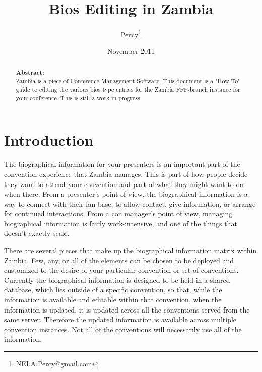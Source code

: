 \documentclass[captions=tablesignature]{scrartcl}
\author{Percy\thanks{NELA.Percy@gmail.com}}
\date{November 2011}
\title{Bios Editing in Zambia}
\begin{document}
\maketitle
{}
\thispagestyle{fancy}
\renewcommand{\headrulewidth}{0pt}
\renewcommand{\footrulewidth}{0pt}
\lhead{}
\rhead{}
\chead{}
\lfoot{}
\cfoot{}
\rfoot{}
\begin{abstract}
\vspace{5cm}
{\LARGE{\textbf{Abstract:\\}}}
Zambia is a piece of Conference Management Software.  This document is a "How To" guide to editing the various bios type entries for the Zambia FFF-branch instance for your conference.  This is still a work in progress.
\end{abstract}
\newpage
\renewcommand{\headrulewidth}{1pt}
\renewcommand{\footrulewidth}{1pt}
\rfoot{\thepage}
\setcounter{tocdepth}{3}
\tableofcontents
\listoftables
\newpage
{}
\section{Introduction}
\label{sec-1}

The biographical information for your presenters is an important
part of the convention experience that Zambia manages.  This is part
of how people decide they want to attend your convention and part of
what they might want to do when there.  From a presenter's point of
view, the biographical information is a way to connect with their
fan-base, to allow contact, give information, or arrange for
continued interactions.  From a con manager's point of view,
managing biographical information is fairly work-intensive, and one
of the things that doesn't exactly scale.

There are several pieces that make up the biographical information
matrix within Zambia.  Few, any, or all of the elements can be
chosen to be deployed and customized to the desire of your
particular convention or set of conventions.  Currently the
biographical information is designed to be held in a shared
database, which lies outside of a specific convention, so that,
while the information is available and editable within that
convention, when the information is updated, it is updated across
all the conventions served from the same server.  Therefore the
updated information is available across multiple convention
instances.  Not all of the conventions will necessarily use all of
the information.
\end{document}
